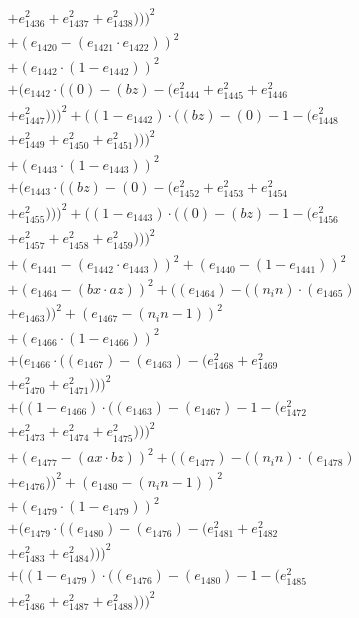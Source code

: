 \documentclass[10pt, a4paper]{article}
\begin{document}
\begin{small}
\begin{align*}
& + e_{1436}^{2} + e_{1437}^{2} + e_{1438}^{2})))^{2} \\
& + (e_{1420} - (e_{1421}  \cdot  e_{1422}))^{2} \\
& + (e_{1442}  \cdot  (1 - e_{1442}))^{2} \\
& + (e_{1442}  \cdot  ((0) - (bz) - (e_{1444}^{2} + e_{1445}^{2} + e_{1446}^{2} \\
& + e_{1447}^{2})))^{2} + ((1 - e_{1442})  \cdot  ((bz) - (0) - 1 - (e_{1448}^{2} \\
& + e_{1449}^{2} + e_{1450}^{2} + e_{1451}^{2})))^{2} \\
& + (e_{1443}  \cdot  (1 - e_{1443}))^{2} \\
& + (e_{1443}  \cdot  ((bz) - (0) - (e_{1452}^{2} + e_{1453}^{2} + e_{1454}^{2} \\
& + e_{1455}^{2})))^{2} + ((1 - e_{1443})  \cdot  ((0) - (bz) - 1 - (e_{1456}^{2} \\
& + e_{1457}^{2} + e_{1458}^{2} + e_{1459}^{2})))^{2} \\
& + (e_{1441} - (e_{1442}  \cdot  e_{1443}))^{2} + (e_{1440} - (1 - e_{1441}))^{2} \\
& + (e_{1464} - (bx  \cdot  az))^{2} + ((e_{1464}) - ((n_in)  \cdot  (e_{1465}) \\
& + e_{1463}))^{2} + (e_{1467} - (n_in - 1))^{2} \\
& + (e_{1466}  \cdot  (1 - e_{1466}))^{2} \\
& + (e_{1466}  \cdot  ((e_{1467}) - (e_{1463}) - (e_{1468}^{2} + e_{1469}^{2} \\
& + e_{1470}^{2} + e_{1471}^{2})))^{2} \\
& + ((1 - e_{1466})  \cdot  ((e_{1463}) - (e_{1467}) - 1 - (e_{1472}^{2} \\
& + e_{1473}^{2} + e_{1474}^{2} + e_{1475}^{2})))^{2} \\
& + (e_{1477} - (ax  \cdot  bz))^{2} + ((e_{1477}) - ((n_in)  \cdot  (e_{1478}) \\
& + e_{1476}))^{2} + (e_{1480} - (n_in - 1))^{2} \\
& + (e_{1479}  \cdot  (1 - e_{1479}))^{2} \\
& + (e_{1479}  \cdot  ((e_{1480}) - (e_{1476}) - (e_{1481}^{2} + e_{1482}^{2} \\
& + e_{1483}^{2} + e_{1484}^{2})))^{2} \\
& + ((1 - e_{1479})  \cdot  ((e_{1476}) - (e_{1480}) - 1 - (e_{1485}^{2} \\
& + e_{1486}^{2} + e_{1487}^{2} + e_{1488}^{2})))^{2} \\

\end{align*}
\end{small}
\end{document}
